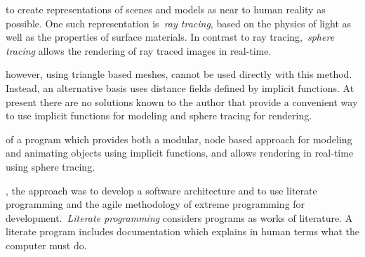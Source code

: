 \documentclass[%
    a4paper,    %
    justified,  %
    nobib,      %
    openany     %
]{tufte-book}
\begin{document}

 to create representations of
scenes and models as near to human reality as possible. One such representation
is~\emph{ray tracing}, based on the physics of light as well as the properties
of surface materials. In contrast to ray tracing,~\emph{sphere tracing} allows
the rendering of ray traced images in real-time.

 however, using triangle
based meshes, cannot be used directly with this method. Instead, an alternative
basis uses distance fields defined by implicit functions. At present there are
no solutions known to the author that provide a convenient way to use implicit
functions for modeling and sphere tracing for rendering.

 of a program which
provides both a modular, node based approach for modeling and animating objects
using implicit functions, and allows rendering in real-time using sphere
tracing.

, the approach was to develop a software
architecture and to use literate programming and the agile methodology of
extreme programming for development.~\emph{Literate programming} considers
programs as works of literature. A literate program includes documentation which
explains in human terms what the computer must do.
\end{document}
